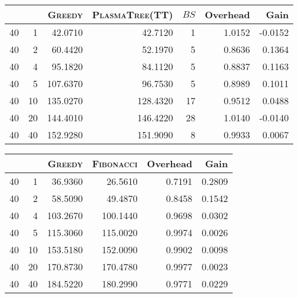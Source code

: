 \documentclass[a4paper,twopages]{article}
\newcommand{\BS}{\ensuremath{\mathit{BS}}\xspace}
\newcommand{\MC}{\textsc{Fibonacci}\xspace}
\newcommand{\Greedy}{\textsc{Greedy}\xspace}
\newcommand{\PT}{\textsc{PlasmaTree}\xspace}
\begin{document}
\begin{table*}
    \centering
    \begin{tabular}{|r|r|r||r|r|r|r|}
       \hline
          &   & \Greedy & \PT (TT) & \BS & Overhead &   Gain\\
         \hline
        40 &  1 &   42.0710 &   42.7120 &  1 &   1.0152 &-0.0152\\
        40 &  2 &   60.4420 &   52.1970 &  5 &   0.8636 & 0.1364\\
        40 &  4 &   95.1820 &   84.1120 &  5 &   0.8837 & 0.1163\\
        40 &  5 &  107.6370 &   96.7530 &  5 &   0.8989 & 0.1011\\
        40 & 10 &  135.0270 &  128.4320 & 17 &   0.9512 & 0.0488\\
        40 & 20 &  144.4010 &  146.4220 & 28 &   1.0140 &-0.0140\\
        40 & 40 &  152.9280 &  151.9090 &  8 &   0.9933 & 0.0067\\
       \hline
    \end{tabular}
    \caption{\Greedy versus \PT (TT) (Experimental Double Complex)}
\end{table*}
\begin{table*}
    \centering
    \begin{tabular}{|r|r|r||r|r|r|}
         \hline
          &   & \Greedy &    \MC & Overhead &   Gain\\
         \hline
        40 &  1 &   36.9360 &  26.5610  &   0.7191 & 0.2809\\
        40 &  2 &   58.5090 &  49.4870  &   0.8458 & 0.1542\\
        40 &  4 &  103.2670 & 100.1440  &   0.9698 & 0.0302\\
        40 &  5 &  115.3060 & 115.0020  &   0.9974 & 0.0026\\
        40 & 10 &  153.5180 & 152.0090  &   0.9902 & 0.0098\\
        40 & 20 &  170.8730 & 170.4780  &   0.9977 & 0.0023\\
        40 & 40 &  184.5220 & 180.2990  &   0.9771 & 0.0229\\
         \hline
    \end{tabular}
    \caption{Greedy versus \MC (Experimental Double)}
\end{table*}
\end{document}
